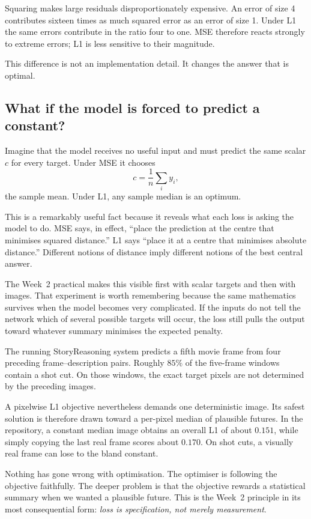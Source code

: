 Squaring makes large residuals disproportionately expensive. An error of size 4 contributes sixteen times as much squared error as an error of size 1. Under L1 the same errors contribute in the ratio four to one. MSE therefore reacts strongly to extreme errors; L1 is less sensitive to their magnitude.

This difference is not an implementation detail. It changes the answer that is optimal.

\subsection{What if the model is forced to predict a constant?}

Imagine that the model receives no useful input and must predict the same scalar \(c\) for every target. Under MSE it chooses
\[
  c = \frac{1}{n}\sum_i y_i,
\]
the sample mean. Under L1, any sample median is an optimum.

This is a remarkably useful fact because it reveals what each loss is asking the model to do. MSE says, in effect, ``place the prediction at the centre that minimises squared distance.'' L1 says ``place it at a centre that minimises absolute distance.'' Different notions of distance imply different notions of the best central answer.

The Week~2 practical makes this visible first with scalar targets and then with images. That experiment is worth remembering because the same mathematics survives when the model becomes very complicated. If the inputs do not tell the network which of several possible targets will occur, the loss still pulls the output toward whatever summary minimises the expected penalty.

\begin{architecturebox}
The running StoryReasoning system predicts a fifth movie frame from four preceding frame--description pairs. Roughly \(85\%\) of the five-frame windows contain a shot cut. On those windows, the exact target pixels are not determined by the preceding images.

A pixelwise L1 objective nevertheless demands one deterministic image. Its safest solution is therefore drawn toward a per-pixel median of plausible futures. In the repository, a constant median image obtains an overall L1 of about \(0.151\), while simply copying the last real frame scores about \(0.170\). On shot cuts, a visually real frame can lose to the bland constant.

Nothing has gone wrong with optimisation. The optimiser is following the objective faithfully. The deeper problem is that the objective rewards a statistical summary when we wanted a plausible future. This is the Week~2 principle in its most consequential form: \emph{loss is specification, not merely measurement}.
\end{architecturebox}

